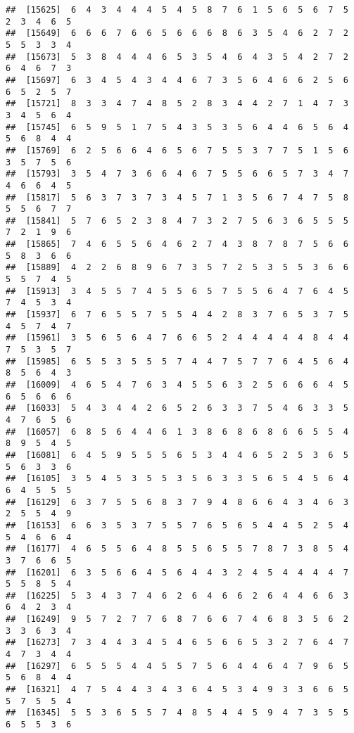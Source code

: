 \documentclass[
]{book}
\begin{document}
\begin{verbatim}
##  [15625]  6  4  3  4  4  4  5  4  5  8  7  6  1  5  6  5  6  7  5  2  3  4  6  5
##  [15649]  6  6  6  7  6  6  5  6  6  6  8  6  3  5  4  6  2  7  2  5  5  3  3  4
##  [15673]  5  3  8  4  4  4  6  5  3  5  4  6  4  3  5  4  2  7  2  6  4  6  7  3
##  [15697]  6  3  4  5  4  3  4  4  6  7  3  5  6  4  6  6  2  5  6  6  5  2  5  7
##  [15721]  8  3  3  4  7  4  8  5  2  8  3  4  4  2  7  1  4  7  3  3  4  5  6  4
##  [15745]  6  5  9  5  1  7  5  4  3  5  3  5  6  4  4  6  5  6  4  5  6  8  4  4
##  [15769]  6  2  5  6  6  4  6  5  6  7  5  5  3  7  7  5  1  5  6  3  5  7  5  6
##  [15793]  3  5  4  7  3  6  6  4  6  7  5  5  6  6  5  7  3  4  7  4  6  6  4  5
##  [15817]  5  6  3  7  3  7  3  4  5  7  1  3  5  6  7  4  7  5  8  5  5  6  7  7
##  [15841]  5  7  6  5  2  3  8  4  7  3  2  7  5  6  3  6  5  5  5  7  2  1  9  6
##  [15865]  7  4  6  5  5  6  4  6  2  7  4  3  8  7  8  7  5  6  6  5  8  3  6  6
##  [15889]  4  2  2  6  8  9  6  7  3  5  7  2  5  3  5  5  3  6  6  5  5  7  4  5
##  [15913]  3  4  5  5  7  4  5  5  6  5  7  5  5  6  4  7  6  4  5  7  4  5  3  4
##  [15937]  6  7  6  5  5  7  5  5  4  4  2  8  3  7  6  5  3  7  5  4  5  7  4  7
##  [15961]  3  5  6  5  6  4  7  6  6  5  2  4  4  4  4  4  8  4  4  7  5  3  5  7
##  [15985]  6  5  5  3  5  5  5  7  4  4  7  5  7  7  6  4  5  6  4  8  5  6  4  3
##  [16009]  4  6  5  4  7  6  3  4  5  5  6  3  2  5  6  6  6  4  5  6  5  6  6  6
##  [16033]  5  4  3  4  4  2  6  5  2  6  3  3  7  5  4  6  3  3  5  4  7  6  5  6
##  [16057]  6  8  5  6  4  4  6  1  3  8  6  8  6  8  6  6  5  5  4  8  9  5  4  5
##  [16081]  6  4  5  9  5  5  5  6  5  3  4  4  6  5  2  5  3  6  5  5  6  3  3  6
##  [16105]  3  5  4  5  3  5  5  3  5  6  3  3  5  6  5  4  5  6  4  6  4  5  5  5
##  [16129]  6  3  7  5  5  6  8  3  7  9  4  8  6  6  4  3  4  6  3  2  5  5  4  9
##  [16153]  6  6  3  5  3  7  5  5  7  6  5  6  5  4  4  5  2  5  4  5  4  6  6  4
##  [16177]  4  6  5  5  6  4  8  5  5  6  5  5  7  8  7  3  8  5  4  3  7  6  6  5
##  [16201]  6  3  5  6  6  4  5  6  4  4  3  2  4  5  4  4  4  4  7  5  5  8  5  4
##  [16225]  5  3  4  3  7  4  6  2  6  4  6  6  2  6  4  4  6  6  3  6  4  2  3  4
##  [16249]  9  5  7  2  7  7  6  8  7  6  6  7  4  6  8  3  5  6  2  3  3  6  3  4
##  [16273]  7  3  4  4  3  4  5  4  6  5  6  6  5  3  2  7  6  4  7  4  7  3  4  4
##  [16297]  6  5  5  5  4  4  5  5  7  5  6  4  4  6  4  7  9  6  5  5  6  8  4  4
##  [16321]  4  7  5  4  4  3  4  3  6  4  5  3  4  9  3  3  6  6  5  5  7  5  5  4
##  [16345]  5  5  3  6  5  5  7  4  8  5  4  4  5  9  4  7  3  5  5  6  5  5  3  6

\end{verbatim}
\end{document}
